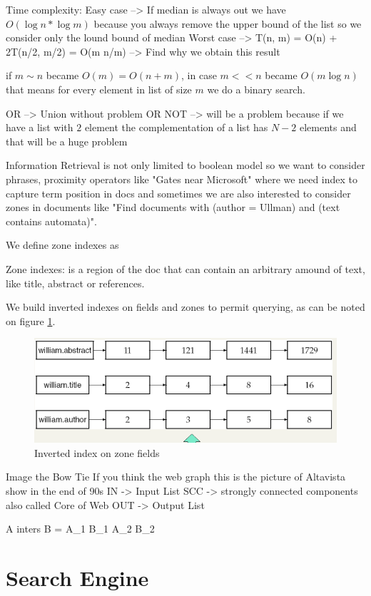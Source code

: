 Time complexity: Easy case --> If median is always out we have $O(\log n * \log m)$ because you always remove the upper bound of the list so we consider only the lound bound of median
                 Worst case --> T(n, m) = O(\log n) + 2T(n/2, m/2) = O(m \log n/m) --> Find why we obtain this result

if $m \sim n$ became $O(m) = O(n + m)$, in case $m << n$ became $O(m \log n)$ that means for every element in list
of size $m$ we do a binary search.

OR --> Union without problem
OR NOT --> will be a problem because if we have a list with $2$ element the complementation of a list has $N - 2$ 
           elements and that will be a huge problem 

Information Retrieval is not only limited to boolean model so we want to consider phrases, proximity operators
like "Gates near Microsoft" where we need index to capture term position in docs and sometimes we are also 
interested to consider zones in documents like "Find documents with (author = Ullman) and (text contains automata)".

We define zone indexes as
\begin{defi}
    Zone indexes: is a region of the doc that can contain an arbitrary amound of text, like title, abstract
                  or references.
\end{defi}
We build inverted indexes on fields and zones to permit querying, as can be noted on figure \ref{img:zoneIndex}.

\begin{figure}
    \caption{Inverted index on zone fields}
    \label{img:zoneIndex}
    \includegraphics[width=\textwidth]{Images/zoneIndex}
\end{figure}




Image the Bow Tie
If you think the web graph this is the picture of Altavista show in the end of 90s 
IN -> Input List
SCC -> strongly connected components also called Core of Web
OUT -> Output List

A inters B = A_1 \cap B_1 \cup A_2 \cap B_2

\section{Search Engine}

